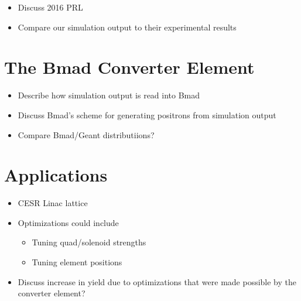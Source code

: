 \documentclass[letter,
               biblatex,     %
               keeplastbox,   %
               ]{jacow}
\begin{document}
\begin{itemize}
\item
Discuss 2016 PRL

\item
Compare our simulation output to their experimental results

\end{itemize}


%
%


\section{The Bmad Converter Element}

\begin{itemize}
\item
Describe how simulation output is read into Bmad

\item
Discuss Bmad's scheme for generating positrons from simulation output

\item
Compare Bmad/Geant distributiions?

\end{itemize}


\section{Applications}

\begin{itemize}
\item
CESR Linac lattice

\item
Optimizations could include
\begin{itemize}
\item
Tuning quad/solenoid strengths

\item
Tuning element positions

\end{itemize}

\item
Discuss increase in yield due to optimizations that were made possible by the converter element?

\end{itemize}
\end{document}
